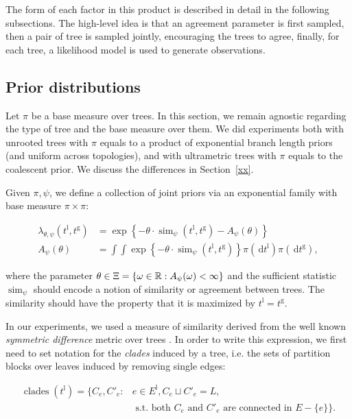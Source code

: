 \documentclass {article}
\DeclareMathOperator{\simi}{sim}
\DeclareMathOperator{\clades}{clades}
\newcommand\lgmap{\psi}
\newcommand\gene{{\mathrm{g}}}
\newcommand\lang{{\mathrm{l}}}
\newcommand{\ud}{\,\mathrm{d}}
\begin{document}
The form of each factor in this product is described in detail in the following subsections.
The high-level idea is that an agreement parameter is first sampled, then a pair of tree is sampled jointly, encouraging the trees to agree, finally, for each tree, a likelihood model is used to generate observations.

\subsection{Prior distributions}\label{sec:agreement}

Let $\pi$ be a base measure over trees.  In this section, we remain agnostic regarding the type of tree and the base measure over them.  We did experiments both with unrooted trees with $\pi$ equals to a product of exponential branch length priors (and uniform across topologies), and with ultrametric trees with $\pi$ equals to the coalescent prior.  We discuss the differences in Section~\ref{xx}.  

Given $\pi,\lgmap$, we define a collection of joint priors via an exponential family with base measure $\pi \times \pi$:

\begin{align*} 
\lambda_{\theta,\lgmap}(t^\lang,t^\gene) &= \exp\left\{ - \theta\cdot \simi_\lgmap(t^\lang,t^\gene) - A_\lgmap(\theta) \right\} \\
A_\lgmap(\theta) &= \int \int \exp\left\{ - \theta\cdot \simi_\lgmap(t^\lang,t^\gene) \right\} \pi(\ud t^\lang) \pi(\ud t^\gene),
\end{align*}

where the parameter $\theta \in \Xi = \{\omega \in \R : A_\lgmap(\omega) < \infty\}$ and the sufficient statistic $\simi_\lgmap$ should encode a notion of similarity or agreement between trees.  The similarity should have the property that it is maximized by $t^\lang = t^\gene$.

In our experiments, we used a measure of similarity derived from the well known \emph{symmetric difference} metric over trees \cite{xx}.  In order to write this expression, we first need to set notation for the \emph{clades} induced by a tree, i.e. the sets of partition blocks over leaves induced by removing single edges:

{\footnotesize
\begin{align*} 
\clades(t^\lang) = \{ C_e, C'_e : &e\in E^\lang, C_e \sqcup C'_e = L, \\
&\textrm{ s.t. both } C_e\textrm{ and }C'_e \textrm{ are connected in } E-\{e\}\}.
\end{align*}
}
\end{document}
